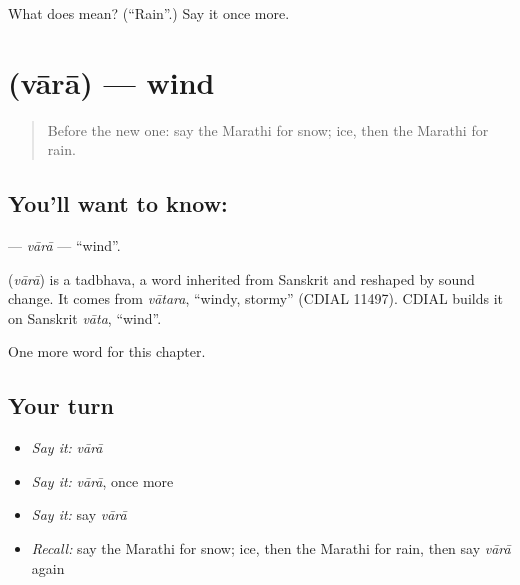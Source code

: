 \begin{tcolorbox}[breakable,colback=teal!4,colframe=teal!35!black,title={Before you move on}]
What does  mean? (\textquotedblleft{}Rain\textquotedblright{}.) Say it once more.
\end{tcolorbox}
\section[\texorpdfstring{\mr{वारा} (vārā)}{वारा (vārā)}]{ (vārā) — wind}

\label{lesson:MR-C99-vara}



\begin{quote}
Before the new one: say the Marathi for snow; ice, then the Marathi for rain.
\end{quote}

\subsection*{You'll want to know: }
\textbf{} — \emph{vārā} — \textquotedblleft{}wind\textquotedblright{}.

\begin{cousinweb}
\textbf{} (\emph{vārā}) is a tadbhava, a word inherited from Sanskrit and reshaped by sound change. It comes from \emph{vātara}, \textquotedblleft{}windy, stormy\textquotedblright{} (CDIAL 11497). CDIAL builds it on Sanskrit \emph{vāta}, \textquotedblleft{}wind\textquotedblright{}.
\end{cousinweb}

\begin{grammarlens}[title={What you've built}]
One more word for this chapter.
\end{grammarlens}

\subsection*{Your turn}
\begin{itemize}
\raggedright
  \item \emph{Say it:} \emph{vārā}
  \item \emph{Say it:} \emph{vārā}, once more
  \item \emph{Say it:} say \emph{vārā}
  \item \emph{Recall:} say the Marathi for snow; ice, then the Marathi for rain, then say \emph{vārā} again
\end{itemize}

